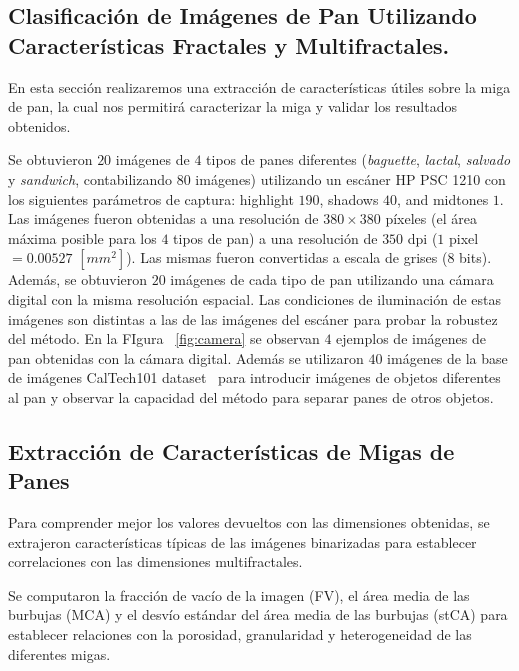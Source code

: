 \documentclass[spanish,a4paper,openright,11pt]{book}
\begin{document}
\subsection{Clasificación de Imágenes de Pan Utilizando Características Fractales y Multifractales.}



En esta sección realizaremos una extracción de características útiles sobre la miga de pan, la cual nos permitirá caracterizar la miga y validar los resultados obtenidos.


Se obtuvieron $20$ imágenes de $4$ tipos de panes diferentes ({\em baguette}, {\em lactal}, {\em salvado} y {\em sandwich}, contabilizando $80$ imágenes) utilizando un escáner HP PSC 1210 con los siguientes parámetros de captura:  highlight $190$, shadows $40$, and midtones $1$. Las imágenes fueron obtenidas a una resolución de $380\times 380$ píxeles (el área máxima posible para los $4$ tipos de pan) a una resolución de $350$ dpi ($1$ pixel $= 0.00527$ $[mm^{2}]$). Las mismas fueron convertidas a escala de grises ($8$ bits). Además, se obtuvieron $20$ imágenes de cada tipo de pan utilizando una cámara digital con la misma resolución espacial. Las condiciones de iluminación de estas imágenes son distintas a las de las imágenes del escáner para probar la robustez del método. En la FIgura ~\ref{fig:camera} se observan $4$ ejemplos de imágenes de pan obtenidas con la cámara digital. Además se utilizaron $40$ imágenes de la base de imágenes CalTech101 dataset~\cite{FeiFei04} para introducir imágenes de objetos diferentes al pan y observar la capacidad del método para separar panes de otros objetos.

\subsection{Extracción de Características de Migas de Panes}
Para comprender mejor los valores devueltos con las dimensiones obtenidas, se extrajeron características típicas de las imágenes binarizadas para establecer correlaciones con las dimensiones multifractales.

Se computaron la fracción de vacío de la imagen (FV), el área media de las burbujas (MCA) y el desvío estándar del área media de las burbujas (stCA) para establecer relaciones con la porosidad, granularidad y heterogeneidad de las diferentes migas.
\end{document}
